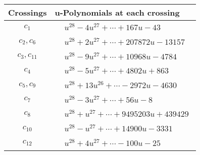 \documentclass[1p]{elsarticle_modified}
\theoremstyle{definition}
\begin{document}
\begin{tabular}{m{50pt}|m{274pt}}
Crossings & \hspace{64pt}u-Polynomials at each crossing \\
\hline $$\begin{aligned}c_{1}\end{aligned}$$&$\begin{aligned}
&u^{28}-4 u^{27}+\cdots+167 u-43
\end{aligned}$\\
\hline $$\begin{aligned}c_{2},c_{6}\end{aligned}$$&$\begin{aligned}
&u^{28}+2 u^{27}+\cdots+207872 u-13157
\end{aligned}$\\
\hline $$\begin{aligned}c_{3},c_{11}\end{aligned}$$&$\begin{aligned}
&u^{28}-9 u^{27}+\cdots+10968 u-4784
\end{aligned}$\\
\hline $$\begin{aligned}c_{4}\end{aligned}$$&$\begin{aligned}
&u^{28}-5 u^{27}+\cdots+4802 u+863
\end{aligned}$\\
\hline $$\begin{aligned}c_{5},c_{9}\end{aligned}$$&$\begin{aligned}
&u^{28}+13 u^{26}+\cdots-2972 u-4630
\end{aligned}$\\
\hline $$\begin{aligned}c_{7}\end{aligned}$$&$\begin{aligned}
&u^{28}-3 u^{27}+\cdots+56 u-8
\end{aligned}$\\
\hline $$\begin{aligned}c_{8}\end{aligned}$$&$\begin{aligned}
&u^{28}+u^{27}+\cdots+9495203 u+439429
\end{aligned}$\\
\hline $$\begin{aligned}c_{10}\end{aligned}$$&$\begin{aligned}
&u^{28}- u^{27}+\cdots+14900 u-3331
\end{aligned}$\\
\hline $$\begin{aligned}c_{12}\end{aligned}$$&$\begin{aligned}
&u^{28}+4 u^{27}+\cdots-100 u-25
\end{aligned}$\\
\hline
\end{tabular}\\~\\
\end{document}
